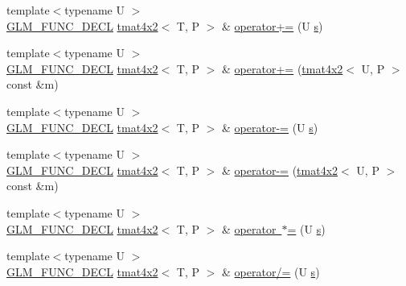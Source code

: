 \begin{DoxyCompactItemize}
\item 
{\footnotesize template$<$typename U $>$ }\\\mbox{\hyperlink{setup_8hpp_ab2d052de21a70539923e9bcbf6e83a51}{G\+L\+M\+\_\+\+F\+U\+N\+C\+\_\+\+D\+E\+CL}} \mbox{\hyperlink{structglm_1_1tmat4x2}{tmat4x2}}$<$ T, P $>$ \& \mbox{\hyperlink{structglm_1_1tmat4x2_afae8ddc6077db543d0b08537c38ea994}{operator+=}} (U \mbox{\hyperlink{glad_8h_af1b1d5edfea6a34daee7389b1b5810ad}{s}})
\item 
{\footnotesize template$<$typename U $>$ }\\\mbox{\hyperlink{setup_8hpp_ab2d052de21a70539923e9bcbf6e83a51}{G\+L\+M\+\_\+\+F\+U\+N\+C\+\_\+\+D\+E\+CL}} \mbox{\hyperlink{structglm_1_1tmat4x2}{tmat4x2}}$<$ T, P $>$ \& \mbox{\hyperlink{structglm_1_1tmat4x2_ac80744038a97a57534282a1fc7ed6a08}{operator+=}} (\mbox{\hyperlink{structglm_1_1tmat4x2}{tmat4x2}}$<$ U, P $>$ const \&m)
\item 
{\footnotesize template$<$typename U $>$ }\\\mbox{\hyperlink{setup_8hpp_ab2d052de21a70539923e9bcbf6e83a51}{G\+L\+M\+\_\+\+F\+U\+N\+C\+\_\+\+D\+E\+CL}} \mbox{\hyperlink{structglm_1_1tmat4x2}{tmat4x2}}$<$ T, P $>$ \& \mbox{\hyperlink{structglm_1_1tmat4x2_ab687cc5fd68c36a44990b257b5413b14}{operator-\/=}} (U \mbox{\hyperlink{glad_8h_af1b1d5edfea6a34daee7389b1b5810ad}{s}})
\item 
{\footnotesize template$<$typename U $>$ }\\\mbox{\hyperlink{setup_8hpp_ab2d052de21a70539923e9bcbf6e83a51}{G\+L\+M\+\_\+\+F\+U\+N\+C\+\_\+\+D\+E\+CL}} \mbox{\hyperlink{structglm_1_1tmat4x2}{tmat4x2}}$<$ T, P $>$ \& \mbox{\hyperlink{structglm_1_1tmat4x2_a370c6855d2279fdd725e9d98589bc886}{operator-\/=}} (\mbox{\hyperlink{structglm_1_1tmat4x2}{tmat4x2}}$<$ U, P $>$ const \&m)
\item 
{\footnotesize template$<$typename U $>$ }\\\mbox{\hyperlink{setup_8hpp_ab2d052de21a70539923e9bcbf6e83a51}{G\+L\+M\+\_\+\+F\+U\+N\+C\+\_\+\+D\+E\+CL}} \mbox{\hyperlink{structglm_1_1tmat4x2}{tmat4x2}}$<$ T, P $>$ \& \mbox{\hyperlink{structglm_1_1tmat4x2_a342ac3ce6bd83738f5b7707053700232}{operator $\ast$=}} (U \mbox{\hyperlink{glad_8h_af1b1d5edfea6a34daee7389b1b5810ad}{s}})
\item 
{\footnotesize template$<$typename U $>$ }\\\mbox{\hyperlink{setup_8hpp_ab2d052de21a70539923e9bcbf6e83a51}{G\+L\+M\+\_\+\+F\+U\+N\+C\+\_\+\+D\+E\+CL}} \mbox{\hyperlink{structglm_1_1tmat4x2}{tmat4x2}}$<$ T, P $>$ \& \mbox{\hyperlink{structglm_1_1tmat4x2_a249db7437c8109b32811b84b543d97a5}{operator/=}} (U \mbox{\hyperlink{glad_8h_af1b1d5edfea6a34daee7389b1b5810ad}{s}})

\end{DoxyCompactItemize}
